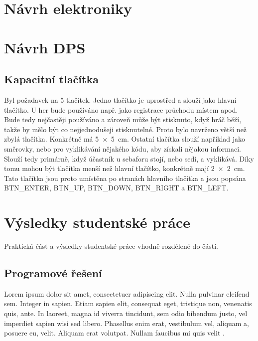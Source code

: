 \chapter{Návrh elektroniky}






\chapter{Návrh DPS}

\section{Kapacitní tlačítka} 
Byl požadavek na 5 tlačítek. Jedno tlačítko je uprostřed a slouží jako hlavní tlačítko. U her bude používáno např. jako registrace průchodu místem apod. Bude tedy nejčastěji
používáno a zároveň může být stisknuto, když hráč běží, takže by mělo být co nejjednodušeji stisknutelné. Proto bylo navrženo větší než zbylá tlačítka. Konkrétně má 
5~$\times$~5~cm. Ostatní tlačítka slouží například jako směrovky, nebo pro vyklikávání nějakého kódu, aby získali nějakou informaci. Slouží tedy primárně, když účastník 
u sebaforu stojí, nebo sedí, a vyklikává. Díky tomu mohou být tlačítka menší než hlavní tlačítko, konkrétně mají 2~$\times$~2~cm. Tato tlačítka jsou proto umístěna 
po stranách hlavního tlačítka a jsou popsána BTN\_ENTER, BTN\_UP, BTN\_DOWN, BTN\_RIGHT a BTN\_LEFT.

\chapter{Výsledky studentské práce}

Praktická část a výsledky studentské práce vhodně rozdělené do částí.

\section{Programové řešení}
Lorem ipsum dolor sit amet, consectetuer adipiscing elit. Nulla pulvinar eleifend sem. Integer in sapien. Etiam sapien elit, consequat eget, tristique non, venenatis quis, ante. In laoreet, magna id viverra tincidunt, sem odio bibendum justo, vel imperdiet sapien wisi sed libero. Phasellus enim erat, vestibulum vel, aliquam a, posuere eu, velit. Aliquam erat volutpat. Nullam faucibus mi quis velit \cite{sr02/2009}.

